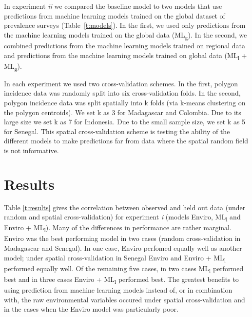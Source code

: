 \documentclass[review]{elsarticle}
\begin{document}
In experiment \emph{ii} we compared the baseline model to two models that use predictions from machine learning models trained on the global dataset of prevalence surveys (Table~\ref{t:models}).
In the first, we used only predictions from the machine learning models trained on the global data (ML\textsubscript{g}).
In the second, we combined predictions from the machine learning models trained on regional data and predictions from the machine learning models trained on global data (ML\textsubscript{l} + ML\textsubscript{g}).


In each experiment we used two cross-validation schemes. 
In the first, polygon incidence data was randomly split into six cross-validation folds.
In the second, polygon incidence data was split spatially into k folds (via k-means clustering on the polygon centroids).
We set k as 3 for Madagascar and Colombia.
Due to its large size we set k as 7 for Indonesia.
Due to the small sample size, we set k as 5 for Senegal.
This spatial cross-validation scheme is testing the ability of the different models to make predictions far from data where the spatial random field is not informative.



\section{Results}



Table \ref{t:results} gives the correlation between observed and held out data (under random and spatial cross-validation) for experiment \emph{i} (models Enviro, ML\textsubscript{l} and Enviro + ML\textsubscript{l}).
Many of the differences in performance are rather marginal.
Enviro was the best performing model in two cases (random cross-validation in Madagascar and Senegal).
In one case, Enviro perfomed equally well as another model; under spatial cross-validation in Senegal Enviro and Enviro + ML\textsubscript{l} performed equally well.
Of the remaining five cases, in two cases ML\textsubscript{l} performed best and in three cases Enviro + ML\textsubscript{l} performed best.
The greatest benefits to using prediction from machine learning models instead of, or in combination with, the raw environmental variables occured under spatial cross-validation and in the cases when the Enviro model was particularly poor.
\end{document}
